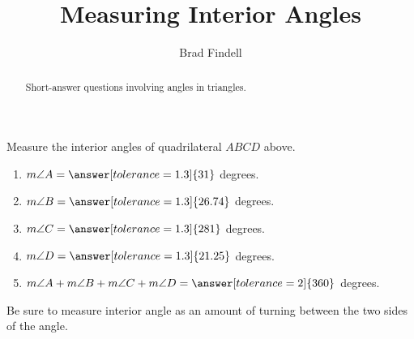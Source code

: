 \documentclass[nooutcomes]{ximera}
\title{Measuring Interior Angles}
\author{Brad Findell}
\begin{document}
\begin{abstract}
Short-answer questions involving angles in triangles. 
\end{abstract}
\maketitle

\begin{center}  
\end{center}
\begin{problem}
Measure the interior angles of quadrilateral $ABCD$ above.  
\begin{enumerate}
\item $m\angle A = \answer[tolerance=1.3]{31}$ degrees.
\item $m\angle B = \answer[tolerance=1.3]{26.74}$ degrees.
\item $m\angle C = \answer[tolerance=1.3]{281}$ degrees.
\item $m\angle D = \answer[tolerance=1.3]{21.25}$ degrees.
\item $m\angle A + m\angle B + m\angle C + m\angle D = \answer[tolerance=2]{360}$ degrees.
\end{enumerate}
\begin{hint}
Be sure to measure interior angle as an amount of turning between the two sides of the angle.   
\end{hint}

\end{problem}
\end{document}

